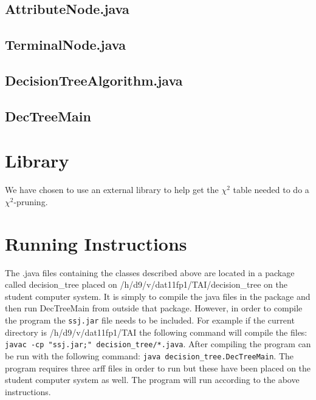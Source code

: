 \documentclass[a4paper]{article}
\begin{document}
\subsection{AttributeNode.java}
\subsection{TerminalNode.java}
\subsection{DecisionTreeAlgorithm.java}
\subsection{DecTreeMain}

\section{Library}
We have chosen to use an external library to help get the $\chi^{2}$ table needed to do a $\chi^{2}$-pruning. 


\section{Running Instructions} The .java files containing the classes described
above are located in a package called decision\_tree placed on
/h/d9/v/dat11fp1/TAI/decision\_tree on the student computer system. It
is simply to compile the java files in the package and then run DecTreeMain from
outside that package. However, in order to compile the program the \texttt{ssj.jar} file needs to be included. For example if the current directory is
/h/d9/v/dat11fp1/TAI the following command will compile the files: \texttt{javac -cp "ssj.jar;"
decision\_tree/*.java}. After compiling the program can be run with
the following command: \texttt{java decision\_tree.DecTreeMain}. The program requires three arff files in order to run but these have been placed on the student computer system as well. The program will run according to the above instructions.

\end{document}
